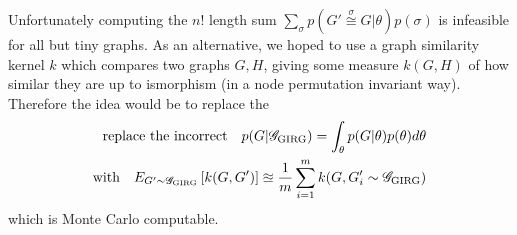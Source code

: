 Unfortunately computing the $n!$ length sum $\sum_{\sigma} p(G' \stackrel{\sigma}{\cong} G | \theta) p(\sigma)$ is infeasible for all but tiny graphs. As an alternative, we hoped to use a graph similarity kernel $k$ which compares two graphs $G, H$, giving some measure $k(G, H)$ of how similar they are up to ismorphism (in a node permutation invariant way).
Therefore the idea would be to replace the
\begin{align}
  \text{replace the incorrect} \quad p(G | \mathscr{G}_{\mathrm{GIRG}}) = \int_\theta p(G | \theta) p(\theta) d\theta
  \\
  \text{with} \quad
E_{G' \sim \mathscr{G}_{\mathrm{GIRG}}} \left [ k(G, G') \right ]\approxeq \frac{1}{m} \sum_{i=1}^m k(G, G'_i \sim \mathscr{G}_{\mathrm{GIRG}})
\end{align}
which is Monte Carlo computable.





  
  
  
